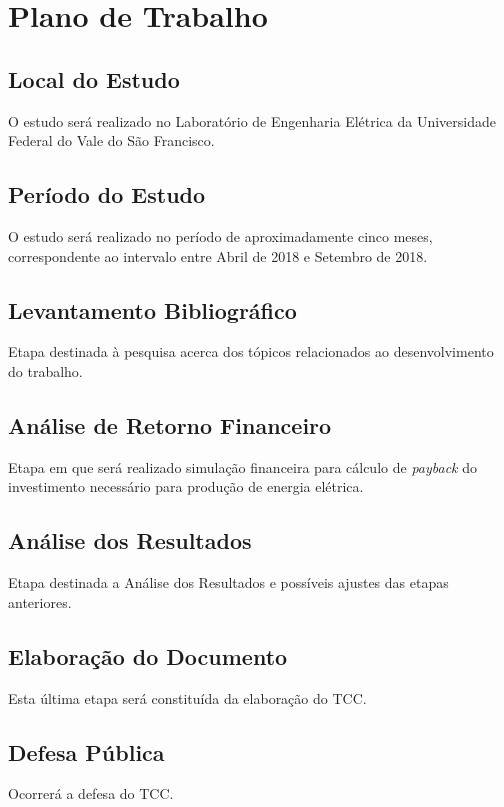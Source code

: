 \chapter{Plano de Trabalho}

\section{Local do Estudo}
O estudo será realizado no Laboratório de Engenharia Elétrica da Universidade Federal do Vale do São Francisco.

\section{Período do Estudo}
O estudo será realizado no período de aproximadamente cinco meses, correspondente ao intervalo entre Abril de 2018 e Setembro de 2018.

\section{Levantamento Bibliográfico}
Etapa destinada à pesquisa acerca dos tópicos relacionados ao desenvolvimento do trabalho.

\section{Análise de Retorno Financeiro}
Etapa em que será realizado simulação financeira para cálculo de \textit{payback} do investimento necessário para produção de energia elétrica.

\section{Análise dos Resultados}
Etapa destinada a Análise dos Resultados e possíveis ajustes das etapas anteriores.

\section{Elaboração do Documento}
Esta última etapa será constituída da elaboração do TCC.

\section{Defesa Pública}
Ocorrerá a defesa do TCC.